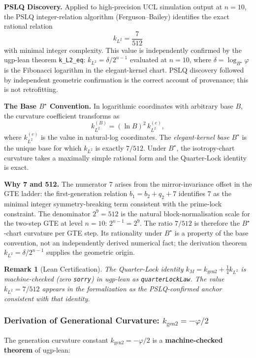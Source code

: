 \documentclass[11pt,twocolumn]{article}
\newtheorem{remark}{Remark}[section]
\newcommand{\fphi}{\varphi}
\begin{document}
\textbf{PSLQ Discovery.}
Applied to high-precision UCL simulation output at $n=10$, the PSLQ integer-relation algorithm (Ferguson--Bailey) identifies the exact rational relation
\[
k_{L^2} = \frac{7}{512}
\]
with minimal integer complexity. This value is independently confirmed by the ugp-lean theorem \texttt{k\_L2\_eq}: $k_{L^2} = \delta / 2^{n-1}$ evaluated at $n=10$, where $\delta = \log_{B^\star}\!\varphi$ is the Fibonacci logarithm in the elegant-kernel chart. PSLQ discovery followed by independent geometric confirmation is the correct account of provenance; this is not retrofitting.

\textbf{The Base $B^\star$ Convention.}
In logarithmic coordinates with arbitrary base $B$, the curvature coefficient transforms as
\[
k_{L^2}^{(B)} = (\ln B)^2\, k_{L^2}^{(e)},
\]
where $k_{L^2}^{(e)}$ is the value in natural-log coordinates. The \emph{elegant-kernel base} $B^\star$ is the unique base for which $k_{L^2}$ is exactly $7/512$. Under $B^\star$, the isotropy-chart curvature takes a maximally simple rational form and the Quarter-Lock identity is exact.

\textbf{Why 7 and 512.}
The numerator 7 arises from the mirror-invariance offset in the GTE ladder: the first-generation relation $b_1 = b_2 + q_2 + 7$ identifies 7 as the minimal integer symmetry-breaking term consistent with the prime-lock constraint. The denominator $2^9 = 512$ is the natural block-normalisation scale for the two-step GTE at level $n=10$: $2^{n-1} = 2^9$. The ratio $7/512$ is therefore the $B^\star$-chart curvature per GTE step. Its rationality under $B^\star$ is a property of the base convention, not an independently derived numerical fact; the derivation theorem $k_{L^2} = \delta/2^{n-1}$ supplies the geometric origin.

\begin{remark}[Lean Certification]
The Quarter-Lock identity $k_M = k_{\mathrm{gen2}} + \tfrac{1}{4}k_{L^2}$ is machine-checked (zero \texttt{sorry}) in ugp-lean as \texttt{quarterLockLaw}. The value $k_{L^2} = 7/512$ appears in the formalization as the PSLQ-confirmed anchor consistent with that identity.
\end{remark}

\subsubsection{Derivation of Generational Curvature: $k_{\text{gen2}} = -\fphi/2$}

The generation curvature constant $k_{\text{gen2}} = -\varphi/2$ is a \textbf{machine-checked theorem} of ugp-lean:
\end{document}
